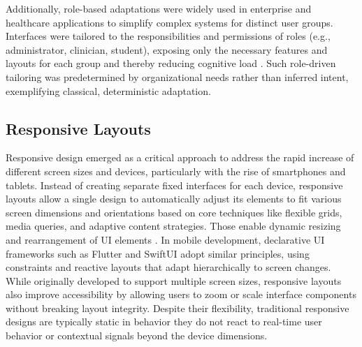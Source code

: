 \documentclass[openany]{book}
\begin{document}
Additionally, role-based adaptations were widely used in enterprise and healthcare applications to simplify complex systems for distinct user groups. Interfaces were tailored to the responsibilities and permissions of roles (e.g., administrator, clinician, student), exposing only the necessary features and layouts for each group and thereby reducing cognitive load \cite{Akiki2014EnterpriseAdaptive,Lin2003RoleBased}. Such role-driven tailoring was predetermined by organizational needs rather than inferred intent, exemplifying classical, deterministic adaptation.

\subsection{Responsive Layouts}
Responsive design emerged as a critical approach to address the rapid increase of different screen sizes and devices, particularly with the rise of smartphones and tablets. Instead of creating separate fixed interfaces for each device, responsive layouts allow a single design to automatically adjust its elements to fit various screen dimensions and orientations based on core techniques like flexible grids, media queries, and adaptive content strategies.  
Those enable dynamic resizing and rearrangement of UI elements \cite{Marcotte2010Responsive}. In mobile development, declarative UI frameworks such as Flutter and SwiftUI adopt similar principles, using constraints and reactive layouts that adapt hierarchically to screen changes.  
While originally developed to support multiple screen sizes, responsive layouts also improve accessibility by allowing users to zoom or scale interface components without breaking layout integrity. Despite their flexibility, traditional responsive designs are typically static in behavior they do not react to real-time user behavior or contextual signals beyond the device dimensions.
\end{document}
